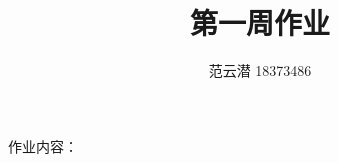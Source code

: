 \documentclass[lang=cn,11pt,a4paper,cite=authoryear]{elegantpaper}
\title{第一周作业}
\author{范云潜 18373486}
\institute{微电子学院 184111 班}
\date{\zhtoday}
\begin{document}
\maketitle

作业内容：

\tableofcontents


\end{document}
